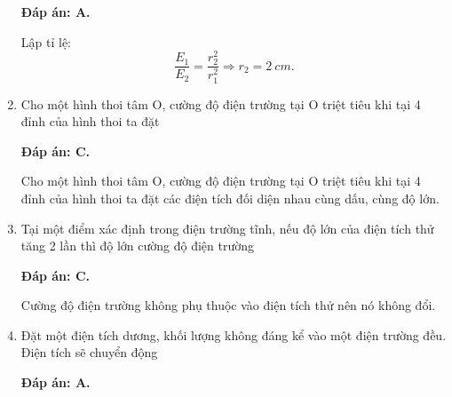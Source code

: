 \begin{enumerate}[label=\bfseries Câu \arabic*:]
{	}
	\loigiai
	{	\textbf{Đáp án: A.}
		
		Lập tỉ lệ:
		$$\dfrac{E_1}{E_2} = \dfrac{r_2^2}{r_1^2} \Rightarrow r_2 = \SI{2}{cm}.$$
	}
	\item {}
	
	\cauhoi
	{Cho một hình thoi tâm O, cường độ điện trường tại O triệt tiêu khi tại 4 đỉnh của hình thoi ta đặt
		
	}
	\loigiai
	{	\textbf{Đáp án: C.}
		
		Cho một hình thoi tâm O, cường độ điện trường tại O triệt tiêu khi tại 4 đỉnh của hình thoi ta đặt các điện tích đối diện nhau cùng dấu, cùng độ lớn.
	}
	\item {}
	
	\cauhoi
	{Tại một điểm xác định trong điện trường tĩnh, nếu độ lớn của điện tích thử tăng 2 lần thì độ lớn cường độ điện trường
		
	}
	\loigiai
	{	\textbf{Đáp án: C.}
		
		Cường độ điện trường không phụ thuộc vào điện tích thử nên nó không đổi.
	}
	\item {}
	
	\cauhoi
	{Đặt một điện tích dương, khối lượng không đáng kể vào một điện trường đều. Điện tích sẽ chuyển động
		
	}
	\loigiai
	{	\textbf{Đáp án: A.}
		
}
\end{enumerate}
